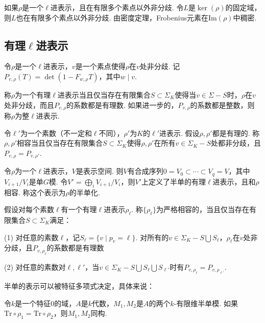 \begin{crem}
    如果$\rho$是一个$\ell$进表示，且在有限多个素点以外非分歧. 令$L$是$\ker(\rho)$的固定域，则$L$也在有限多个素点以外非分歧. 由\Chebotarev 密度定理，Frobenius元素在$\mathrm{Im}(\rho)$中稠密.
\end{crem}

\subsection{有理\texorpdfstring{$\ell$}{ELL}进表示}

令$\rho$是一个$\ell$进表示，$v$是一个素点使得$\rho$在$v$处非分歧. 记$P_{v, \rho}(T) = \det (1 - F_{w, \rho}T)$，其中$w\mid v$.

\begin{cdef}
    称$\rho$为一个有理$\ell$进表示当且仅当存在有限集合$S\subset \Sigma_K$使得当$v\in \Sigma - S$时，$\rho$在$v$处非分歧，而且$P_{v, \rho}$的系数都是有理数. 如果进一步的，$P_{v,\rho}$的系数都是整数，则称$\rho$为整$\ell$进表示.
\end{cdef}

\begin{cdef}
    令$\ell'$为一个素数（不一定和$\ell$不同），$\rho'$为$K$的$\ell'$进表示. 假设$\rho, \rho'$都是有理的. 称$\rho, \rho'$相容当且仅当存在有限集合$S\subset \Sigma_K$使得$\rho, \rho'$在所有$v\in \Sigma_K - S$处都非分歧，且$P_{v,\rho} = P_{v, \rho'}$.
\end{cdef}

令$\rho$为一个$\ell$进表示，$V$是表示空间. 则$V$有合成序列$0 = V_0\subset \cdots \subset V_q = V$，其中$V_{i+1}/V_i$是单$G$模. 令$V' = \bigoplus_i V_{i+1}/V_i$，则$V'$上定义了半单的有理$\ell$进表示，且和$\rho$相容. 称这个表示为$\rho$的半单化.

\begin{cdef}
    假设对每个素数$\ell$有一个有理$\ell$进表示$\rho_{\ell}$. 称$\{\rho_{\ell}\}$为严格相容的，当且仅当存在有限集合$S\subset \Sigma_K$满足：

    (1) 对任意的素数$\ell$，记$S_{\ell} = \{v\mid p_v = \ell\}$. 对所有的$v\in \Sigma_K - S\bigcup S_{\ell}$，$\rho_{\ell}$在$v$处非分歧，且$P_{v, \rho_{\ell}}$的系数都是有理数

    (2) 对任意的素数对$\ell, \ell'$，当$v\in \Sigma_K - S\bigcup S_{\ell}\bigcup S_{\ell'}$时有$P_{v, \rho_{\ell}} = P_{v, \rho_{\ell'}}$.
\end{cdef}

半单的表示可以被特征多项式决定，具体来说：

\begin{clem}
    令$k$是一个特征$0$的域，$A$是$k$代数，$M_1, M_2$是$A$的两个$k$-有限维半单模. 如果$\mathrm{Tr}\circ \rho_1 = \mathrm{Tr}\circ \rho_2$，则$M_1, M_2$同构.
\end{clem}

